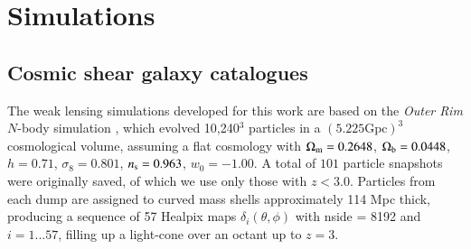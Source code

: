\section{Simulations}
\label{sec:sims}

\subsection{Cosmic shear galaxy catalogues} 
\label{subsec:WL_cats}

The weak lensing simulations developed for this work are based on  the {\it Outer Rim} $N$-body simulation \citep{OuterRim}, which evolved 10,240$^3$ particles in a $(5.225 \mathrm{Gpc})^3$ cosmological volume, assuming a flat \lcdm cosmology with $\Omega_{\rm m}=0.2648$, $\Omega_{\rm b}=0.0448$, $h=0.71$, $\sigma_8 = 0.801$, $n_{\rm s}= 0.963$, $w_0=-1.00$.
A total of $101$ particle snapshots were originally saved, of which we use only those with $z<3.0$. Particles from each dump are assigned to curved mass shells approximately 114 Mpc thick, producing a sequence of 57 {\sc Healpix} maps $\delta_i(\theta, \phi)$ with {\sc nside} = 8192 and $i=1...57$, filling up a light-cone over an octant up to $z = 3$.

